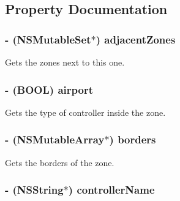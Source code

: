 \subsection{\-Property \-Documentation}
\hypertarget{interface_a_t_c_zone_a983cb960ce7e66488a30c4f680d03992}{
\subsubsection[{adjacent\-Zones}]{\setlength{\rightskip}{0pt plus 5cm}-\/ (\-N\-S\-Mutable\-Set$\ast$) adjacent\-Zones}}
\label{interface_a_t_c_zone_a983cb960ce7e66488a30c4f680d03992}
\-Gets the zones next to this one. \hypertarget{interface_a_t_c_zone_a05bb671c054d56d893055a229a715d3c}{
\subsubsection[{airport}]{\setlength{\rightskip}{0pt plus 5cm}-\/ (\-B\-O\-O\-L) airport}}
\label{interface_a_t_c_zone_a05bb671c054d56d893055a229a715d3c}
\-Gets the type of controller inside the zone. \hypertarget{interface_a_t_c_zone_af14626c068a359ac9e10fd743d92a570}{
\subsubsection[{borders}]{\setlength{\rightskip}{0pt plus 5cm}-\/ (\-N\-S\-Mutable\-Array$\ast$) borders}}
\label{interface_a_t_c_zone_af14626c068a359ac9e10fd743d92a570}
\-Gets the borders of the zone. \hypertarget{interface_a_t_c_zone_a3fe3adaf6c79042c465b8be59970316f}{
\subsubsection[{controller\-Name}]{\setlength{\rightskip}{0pt plus 5cm}-\/ (\-N\-S\-String$\ast$) controller\-Name}}
